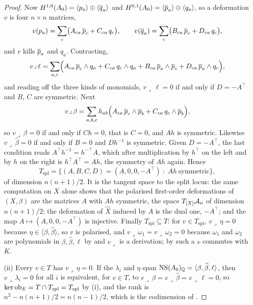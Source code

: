 \begin{proof}
Now $H^{1,0}(A_{0})=\langle p_{a}\rangle\oplus\langle\overline{q}_{a}\rangle$ and
$H^{0,1}(A_{0})=\langle\overline{p}_{a}\rangle\oplus\langle q_{a}\rangle$, so a
deformation $v$ is four $n\times n$ matrices,
\[
  v(p_{a})=\sum_{c}\bigl(A_{ca}\,\overline{p}_{c}+C_{ca}\,q_{c}\bigr),
  \qquad
  v(\overline{q}_{a})=\sum_{c}\bigl(B_{ca}\,\overline{p}_{c}+D_{ca}\,q_{c}\bigr),
\]
and $v$ kills $\overline{p}_{a}$ and $q_{a}$. Contracting,
\[
  v\lrcorner\,\ell
  =\sum_{a,c}\Bigl(A_{ca}\,\overline{p}_{c}\wedge q_{a}+C_{ca}\,q_{c}\wedge q_{a}
   +B_{ca}\,\overline{p}_{a}\wedge\overline{p}_{c}+D_{ca}\,\overline{p}_{a}\wedge q_{c}\Bigr),
\]
and reading off the three kinds of monomials, $v\lrcorner\,\ell=0$ if and only
if $D=-A^{\top}$ and $B$, $C$ are symmetric. Next
\[
  v\lrcorner\,\beta
  =\sum_{a,b,c}h_{ab}\Bigl(A_{ca}\,\overline{p}_{c}\wedge\overline{p}_{b}
   +C_{ca}\,q_{c}\wedge\overline{p}_{b}\Bigr),
\]
so $v\lrcorner\,\beta=0$ if and only if $Ch=0$, that is $C=0$, and $Ah$ is
symmetric. Likewise $v\lrcorner\,\widehat\beta=0$ if and only if $B=0$ and
$Dh^{-1}$ is symmetric. Given $D=-A^{\top}$, the last condition reads
$A^{\top}h^{-1}=h^{-\top}A$, which after multiplication by $h^{\top}$ on the
left and by $h$ on the right is $h^{\top}A^{\top}=Ah$, the symmetry of $Ah$
again. Hence
\[
  T_{\mathrm{spl}}=\bigl\{(A,B,C,D)=(A,0,0,-A^{\top})\;:\;Ah\ \text{symmetric}\bigr\},
\]
of dimension $n(n+1)/2$. It is the tangent space to the split locus: the
same computation on $X$ alone shows that the polarised first-order
deformations of $(X,\beta)$ are the matrices $A$ with $Ah$ symmetric, the
space $T_{[X]}\mathcal{A}_{n}$ of dimension $n(n+1)/2$; the deformation of
$\widehat X$ induced by $A$ is the dual one, $-A^{\top}$; and the map
$A\mapsto(A,0,0,-A^{\top})$ is injective. Finally $T_{\mathrm{spl}}\subseteq
T$: for $v\in T_{\mathrm{spl}}$, $v\lrcorner\,\eta=0$ because
$\eta\in\langle\beta,\widehat\beta\rangle$, so $v$ is polarised, and
$v\lrcorner\,\omega_{1}=v\lrcorner\,\omega_{2}=0$ because $\omega_{1}$ and
$\omega_{2}$ are polynomials in $\beta,\widehat\beta,\ell$ by
\cite[Theorem~15.2]{paperI} and $v\lrcorner$ is a derivation; by
\cite[Proposition~9.14]{paperI} such a $v$ commutes with $K$.

(ii) Every $v\in T$ has $v\lrcorner\,\eta=0$. If the $\lambda_{i}$ and
$\eta$ span $\mathrm{NS}(A_{0})_{\mathbb{Q}}=\langle\beta,\widehat\beta,\ell\rangle$, then
$v\lrcorner\,\lambda_{i}=0$ for all $i$ is equivalent, for $v\in T$, to
$v\lrcorner\,\beta=v\lrcorner\,\widehat\beta=v\lrcorner\,\ell=0$, so
$\ker\operatorname{ob}_{E}=T\cap T_{\mathrm{spl}}=T_{\mathrm{spl}}$ by (i), and the rank
is $n^{2}-n(n+1)/2=n(n-1)/2$, which is the codimension of
\cite[Proposition~15.19(iii)]{paperI}.


\end{proof}
